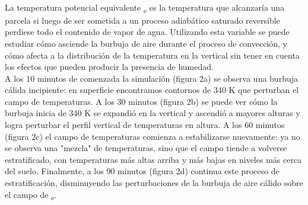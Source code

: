 \documentclass[a4paper, 11 pt]{article}
\begin{document}
\text{}\\  La temperatura potencial equivalente \textTheta\textsubscript{e} es la temperatura que alcanzaría una parcela si luego de ser sometida a un proceso adiabático saturado reversible perdiese todo el contenido de vapor de agua. Utilizando esta variable se puede estudiar cómo asciende la burbuja de aire durante el proceso de convección, y cómo afecta a la distribución de la temperatura en la vertical sin tener en cuenta los efectos que pueden producir la presencia de humedad. \\
A los 10 minutos de comenzada la simulación (figura 2a) se observa una burbuja cálida incipiente: en superficie encontramos contornos de 340 K que perturban el campo de temperaturas. A los 30 minutos (figura 2b) se puede ver cómo la burbuja inicia de 340 K se expandió en la vertical y ascendió a mayores alturas y logra perturbar el perfil vertical de temperaturas en altura. A los 60 minutos (figura 2c) el campo de temperaturas comienza a estabilizarse nuevamente: ya no se observa una "mezcla" de temperaturas, sino que el campo tiende a volverse estratificado, con temperaturas más altas arriba y más bajas en niveles más cerca del suelo. Finalmente, a los 90 minutos (figura 2d) continua este proceso de estratificación, disminuyendo las perturbaciones de la burbuja de aire cálido sobre el campo de \textTheta\textsubscript{e}.
\end{document}
